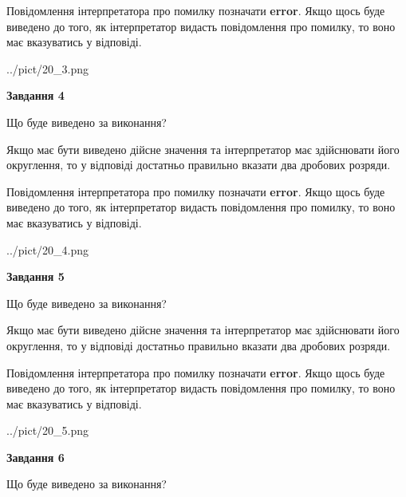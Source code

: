 \documentclass[12pt, ukrainian]{article}
\begin{document}
{\begin {Large}
Повідомлення інтерпретатора про помилку позначати \textbf{error}.
Якщо щось буде виведено до того, як інтерпретатор видасть повідомлення про помилку, 
то воно має вказуватись у відповіді. \par

\begin{center}
	{../pict/20_3.png}
\end{center}
\newpage

{\begin {center}\textbf{Завдання 4}\end {center}}\par
Що буде виведено за виконання? \par

Якщо має бути виведено дійсне значення та інтерпретатор має здійснювати його округлення, 
то у відповіді достатньо правильно вказати два дробових розряди.

Повідомлення інтерпретатора про помилку позначати \textbf{error}.
Якщо щось буде виведено до того, як інтерпретатор видасть повідомлення про помилку, 
то воно має вказуватись у відповіді. \par

\begin{center}
	{../pict/20_4.png}
\end{center}
\newpage

{\begin {center}\textbf{Завдання 5}\end {center}}\par
Що буде виведено за виконання? \par

Якщо має бути виведено дійсне значення та інтерпретатор має здійснювати його округлення, 
то у відповіді достатньо правильно вказати два дробових розряди.

Повідомлення інтерпретатора про помилку позначати \textbf{error}.
Якщо щось буде виведено до того, як інтерпретатор видасть повідомлення про помилку, 
то воно має вказуватись у відповіді. \par

\begin{center}
	{../pict/20_5.png}
\end{center}
\newpage

{\begin {center}\textbf{Завдання 6}\end {center}}\par
Що буде виведено за виконання? \par


\end{Large}}
\end{document}
